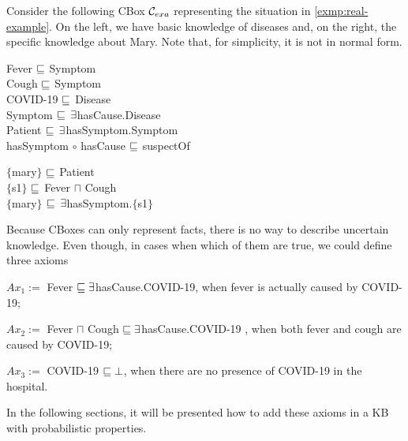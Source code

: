 \begin{example}
	\label{exmp:el-cbox-def}
	Consider the following CBox $\mathcal{C}_{exa}$ representing the situation in \autoref{exmp:real-example}. On the left, we have basic knowledge of diseases and, on the right, the specific knowledge about Mary. Note that, for simplicity, it is not in normal form.

		{
			\sffamily
			\begin{center}
				\begin{minipage}{0,4\textwidth}
					\fontsize{10}{14}
					\selectfont
					Fever $\sqsubseteq$ Symptom\\
					Cough $\sqsubseteq$ Symptom\\
					COVID-19 $\sqsubseteq$ Disease\\
					Symptom $\sqsubseteq \, \exists$hasCause.Disease\\
					Patient $\sqsubseteq\, \exists$hasSymptom.Symptom\\
					hasSymptom $\circ$ hasCause $\sqsubseteq$ suspectOf\\
				\end{minipage}
				\hspace{10pt}
				\begin{minipage}{0,4\textwidth}
					\fontsize{10}{14}
					\selectfont
					$\{$mary$\}$ $\sqsubseteq$ Patient\\
					$\{$s1$\}$ $\sqsubseteq$ Fever $\sqcap$ Cough\\
					$\{$mary$\}$ $\sqsubseteq \, \exists$hasSymptom.$\{$s1$\}$\\
				\end{minipage}
			\end{center}
		}

	Because CBoxes can only represent facts, there is no way to describe uncertain knowledge. Even though, in cases when which of them are true, we could define three axioms

	\begin{description}
		\item { \sffamily $Ax_1 := $ Fever $\sqsubseteq \exists$hasCause.COVID-19}, when fever is actually caused by COVID-19;
		\item { \sffamily $Ax_2 :=$ Fever $\sqcap$ Cough $\sqsubseteq \exists$hasCause.COVID-19 }, when both fever and cough are caused by COVID-19;
		\item { \sffamily $Ax_3 :=$ COVID-19 $\sqsubseteq \bot$}, when there are no presence of COVID-19 in the hospital.
	\end{description}

	In the following sections, it will be presented how to add these axioms in a KB with probabilistic properties.
\end{example}

